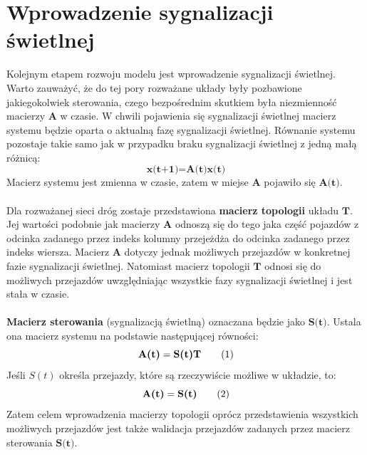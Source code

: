 \documentclass[12pt]{book}
\theoremstyle{plain}
\newcommand\addtag{\refstepcounter{equation}
\renewcommand{\labelenumii}{\theenumii}
\renewcommand{\theenumii}{\theenumi.\arabic{enumii}.}
\tag{\theequation}}
\begin{document}
\section{Wprowadzenie sygnalizacji świetlnej}
Kolejnym etapem rozwoju modelu jest wprowadzenie sygnalizacji świetlnej. Warto zauważyć, że do tej pory rozważane układy były pozbawione jakiegokolwiek sterowania, czego bezpośrednim skutkiem była niezmienność macierzy $\textbf{A}$ w czasie. W chwili pojawienia się sygnalizacji świetlnej macierz systemu będzie oparta o aktualną fazę sygnalizacji świetlnej. Równanie systemu pozostaje takie samo jak w przypadku braku sygnalizacji świetlnej z jedną małą różnicą:
\[\textbf{x(t+1)}=\textbf{A(t)x(t)}\]
Macierz systemu jest zmienna w czasie, zatem w miejse $\textbf{A}$ pojawiło się $\textbf{A(t)}$. \\ \\
Dla rozważanej sieci dróg zostaje przedstawiona \textbf{macierz topologii} układu $\textbf{T}$. Jej wartości podobnie jak macierzy $\textbf{A}$ odnoszą się do tego jaka część pojazdów z odcinka zadanego przez indeks kolumny przejeżdża do odcinka zadanego przez indeks wiersza. Macierz $\textbf{A}$ dotyczy jednak możliwych przejazdów w konkretnej fazie sygnalizacji świetlnej. Natomiast macierz topologii $\textbf{T}$ odnosi się do możliwych przejazdów uwzględniając wszystkie fazy sygnalizacji świetlnej i jest stała w czasie. \\ \\
\noindent
\textbf{Macierz sterowania} (sygnalizacją świetlną) oznaczana będzie jako $\textbf{S(t)}$. Ustala ona macierz systemu na podstawie następującej równości:
\[\textbf{A(t)}=\textbf{S(t)T} \addtag \]
Jeśli $S(t)$ określa przejazdy, które są rzeczywiście możliwe w układzie, to:
\[\textbf{A(t)}=\textbf{S(t)} \addtag \]
Zatem celem wprowadzenia macierzy topologii oprócz przedstawienia wszystkich możliwych przejazdów jest także walidacja przejazdów zadanych przez macierz sterowania $\textbf{S(t)}$.
\end{document}
